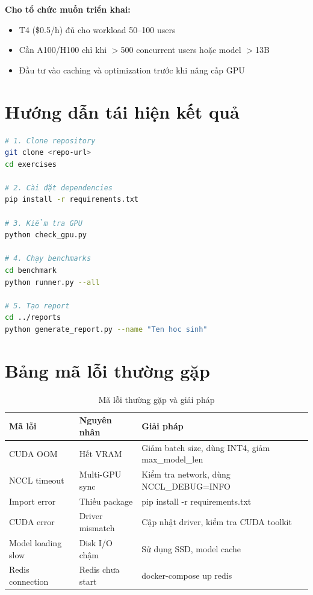 \documentclass[12pt,a4paper]{report}
\begin{document}
\textbf{Cho tổ chức muốn triển khai:}
\begin{itemize}
  \item T4 (\$0.5/h) đủ cho workload 50--100 users
  \item Cần A100/H100 chỉ khi $>$500 concurrent users hoặc model $>$13B
  \item Đầu tư vào caching và optimization trước khi nâng cấp GPU
\end{itemize}

\newpage

\appendix

\chapter{Hướng dẫn tái hiện kết quả}

\begin{lstlisting}[language=bash,caption={Tái hiện kết quả}]
# 1. Clone repository
git clone <repo-url>
cd exercises

# 2. Cài đặt dependencies
pip install -r requirements.txt

# 3. Kiểm tra GPU
python check_gpu.py

# 4. Chạy benchmarks
cd benchmark
python runner.py --all

# 5. Tạo report
cd ../reports
python generate_report.py --name "Ten hoc sinh"
\end{lstlisting}

\chapter{Bảng mã lỗi thường gặp}

\begin{table}[h]
\centering
\caption{Mã lỗi thường gặp và giải pháp}
\label{tab:error-codes}
\begin{tabular}{p{3cm}p{4cm}p{6cm}}
\toprule
\textbf{Mã lỗi} & \textbf{Nguyên nhân} & \textbf{Giải pháp} \\
\midrule
CUDA OOM & Hết VRAM & Giảm batch size, dùng INT4, giảm max\_model\_len \\
NCCL timeout & Multi-GPU sync & Kiểm tra network, dùng NCCL\_DEBUG=INFO \\
Import error & Thiếu package & pip install -r requirements.txt \\
CUDA error & Driver mismatch & Cập nhật driver, kiểm tra CUDA toolkit \\
Model loading slow & Disk I/O chậm & Sử dụng SSD, model cache \\
Redis connection & Redis chưa start & docker-compose up redis \\
\bottomrule
\end{tabular}
\end{table}
\end{document}
